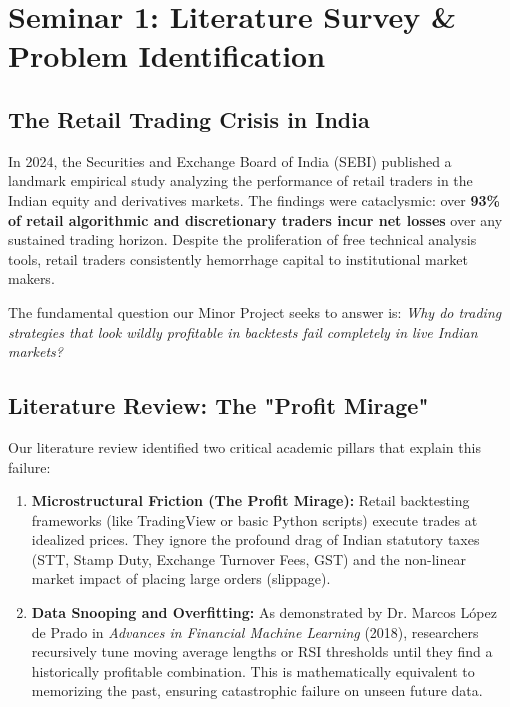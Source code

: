 \documentclass[12pt,a4paper,oneside]{report}
\begin{document}
\tableofcontents
\clearpage
\listoffigures
\clearpage
\listoftables
\clearpage


\chapter{Seminar 1: Literature Survey \& Problem Identification}

\section{The Retail Trading Crisis in India}
In 2024, the Securities and Exchange Board of India (SEBI) published a landmark empirical study analyzing the performance of retail traders in the Indian equity and derivatives markets. The findings were cataclysmic: over \textbf{93\% of retail algorithmic and discretionary traders incur net losses} over any sustained trading horizon. Despite the proliferation of free technical analysis tools, retail traders consistently hemorrhage capital to institutional market makers. 

The fundamental question our Minor Project seeks to answer is: \textit{Why do trading strategies that look wildly profitable in backtests fail completely in live Indian markets?}

\section{Literature Review: The "Profit Mirage"}
Our literature review identified two critical academic pillars that explain this failure:
\begin{enumerate}
    \item \textbf{Microstructural Friction (The Profit Mirage):} Retail backtesting frameworks (like TradingView or basic Python scripts) execute trades at idealized prices. They ignore the profound drag of Indian statutory taxes (STT, Stamp Duty, Exchange Turnover Fees, GST) and the non-linear market impact of placing large orders (slippage).
    \item \textbf{Data Snooping and Overfitting:} As demonstrated by Dr. Marcos L\'opez de Prado in \textit{Advances in Financial Machine Learning} (2018), researchers recursively tune moving average lengths or RSI thresholds until they find a historically profitable combination. This is mathematically equivalent to memorizing the past, ensuring catastrophic failure on unseen future data.
\end{enumerate}
\end{document}
